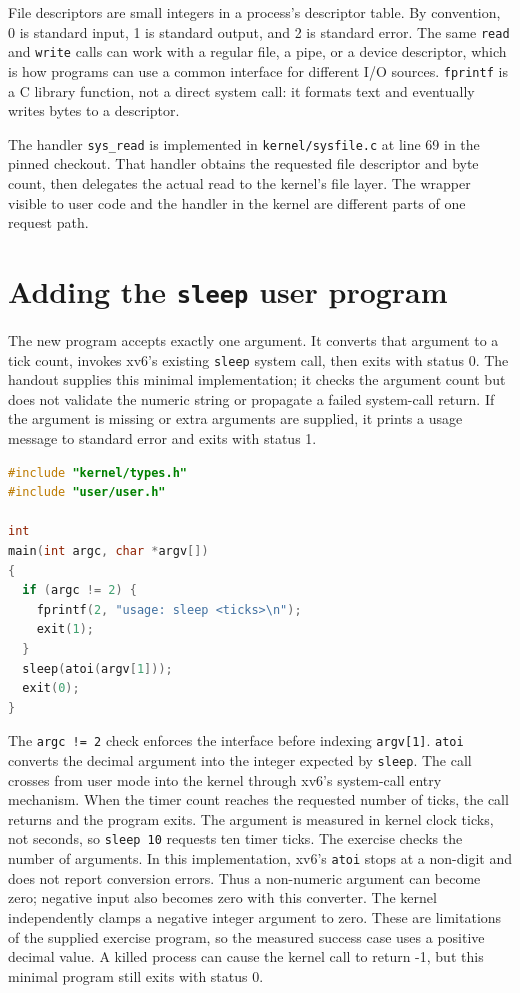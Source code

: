 \documentclass{assets/utmreport}
\begin{document}
File descriptors are small integers in a process's descriptor table. By convention, 0 is standard input, 1 is standard output, and 2 is standard error. The same \texttt{read} and \texttt{write} calls can work with a regular file, a pipe, or a device descriptor, which is how programs can use a common interface for different I/O sources. \texttt{fprintf} is a C library function, not a direct system call: it formats text and eventually writes bytes to a descriptor.

The handler \texttt{sys\_read} is implemented in \texttt{kernel/sysfile.c} at line 69 in the pinned checkout. That handler obtains the requested file descriptor and byte count, then delegates the actual read to the kernel's file layer. The wrapper visible to user code and the handler in the kernel are different parts of one request path.

\section{Adding the \texttt{sleep} user program}

The new program accepts exactly one argument. It converts that argument to a tick count, invokes xv6's existing \texttt{sleep} system call, then exits with status 0. The handout supplies this minimal implementation; it checks the argument count but does not validate the numeric string or propagate a failed system-call return. If the argument is missing or extra arguments are supplied, it prints a usage message to standard error and exits with status 1.

\noindent\begin{minipage}{\linewidth}
\begin{lstlisting}[language=C,caption={user/sleep.c}]
#include "kernel/types.h"
#include "user/user.h"

int
main(int argc, char *argv[])
{
  if (argc != 2) {
    fprintf(2, "usage: sleep <ticks>\n");
    exit(1);
  }
  sleep(atoi(argv[1]));
  exit(0);
}
\end{lstlisting}
\end{minipage}\par


The \texttt{argc != 2} check enforces the interface before indexing \texttt{argv[1]}. \texttt{atoi} converts the decimal argument into the integer expected by \texttt{sleep}. The call crosses from user mode into the kernel through xv6's system-call entry mechanism. When the timer count reaches the requested number of ticks, the call returns and the program exits. The argument is measured in kernel clock ticks, not seconds, so \texttt{sleep 10} requests ten timer ticks. The exercise checks the number of arguments. In this implementation, xv6's \texttt{atoi} stops at a non-digit and does not report conversion errors. Thus a non-numeric argument can become zero; negative input also becomes zero with this converter. The kernel independently clamps a negative integer argument to zero. These are limitations of the supplied exercise program, so the measured success case uses a positive decimal value. A killed process can cause the kernel call to return -1, but this minimal program still exits with status 0.
\end{document}
